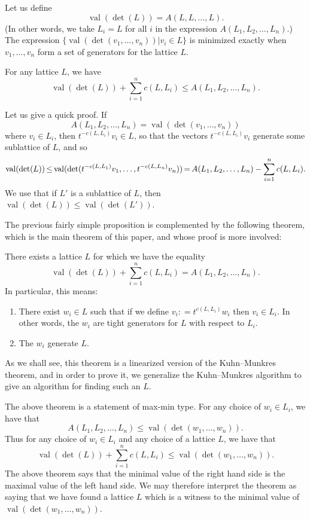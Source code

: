 \documentclass[ALCO,ThmDefs,Unicode,epreuves]{cedram}
\newcommand{\val}{\operatorname{val}}
\newcommand*{\Mk}{\mkern -2mu}
\begin{document}
Let us define 
\[
\val(\det(L)) = A(L,L,\dots, L).
\]
(In other words, we take $L_i=L$ for all $i$ in the expression $A(L_1, L_2, \dots, L_n)$.) The expression $\{\val(\det(v_1, \dots, v_n)) | v_i \in L\}$ is minimized exactly when $v_1, \dots, v_n$ form a set of generators for the lattice $L$.

\begin{prop} For any lattice $L$, we have
\[
\val(\det(L)) + \sum_{i=1}^n c(L,L_i) \leq A(L_1, L_2, \dots, L_n).
\]
\end{prop}
Let us give a quick proof. If
\[
A(L_1, L_2, \dots, L_n) = \val(\det(v_1, \dots, v_n))
\]
where $v_i \in L_i$, then $t^{-c(L,L_i)}v_i \in L$, so that the vectors $t^{-c(L,L_i)}v_i$ generate some sublattice of $L$, and so
\[
\val(\det(L)) \Mk \leq \Mk \val(\det(t^{-c(L,L_1)}v_1, \dots, t^{-c(L,L_n)}v_n)) \Mk = \Mk A(L_1, L_2, \dots, L_n) - \sum_{i=1}^n c(L,L_i).
\]
We use that if $L'$ is a sublattice of $L$, then $\val(\det(L)) \leq \val(\det(L'))$.

The previous fairly simple proposition is complemented by the following theorem, which is the main theorem of this paper, and whose proof is more involved:

\begin{theorem} \label{main} There exists a lattice $L$ for which we have the equality
\[
\val(\det(L)) + \sum_{i=1}^n c(L,L_i) = A(L_1, L_2, \dots, L_n).
\]
In particular, this means: 
\begin{enumerate}
\item There exist $w_i \in L$ such that if we define $v_i : = t^{c(L,L_i)} w_i$ then $v_i \in L_i$. In other words, the $w_i$ are tight generators for $L$ with respect to $L_i$.
\item The $w_i$ generate $L$.
\end{enumerate}
\end{theorem}

As we shall see, this theorem is a linearized version of the Kuhn--Munkres theorem, and in order to prove it, we generalize the Kuhn--Munkres algorithm to give an algorithm for finding such an $L$.

\begin{rema} The above theorem is a statement of max-min type. For any choice of $w_i \in L_i$, we have that 
\[
A(L_1, L_2, \dots, L_n) \leq \val(\det(w_1, \dots, w_n)).
\]
Thus for any choice of $w_i \in L_i$ and any choice of a lattice $L$, we have that
\[
\val(\det(L)) + \sum_{i=1}^n c(L,L_i) \leq \val(\det(w_1, \dots, w_n)).
\]
The above theorem says that the minimal value of the right hand side is the maximal value of the left hand side. We may therefore interpret the theorem as saying that we have found a lattice $L$ which is a witness to the minimal value of $\val(\det(w_1, \dots, w_n)).$
\end{rema}
\end{document}
